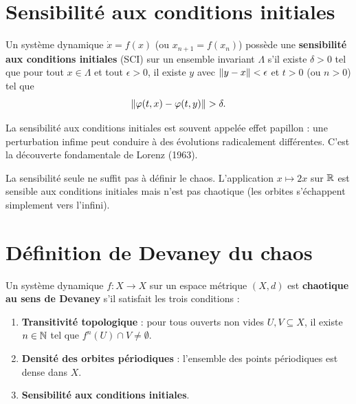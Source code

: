 \section{Sensibilit\'e aux conditions initiales}

\begin{definition}
Un syst\`eme dynamique $\dot{x} = f(x)$ (ou $x_{n+1} = f(x_n)$) poss\`ede
une \textbf{sensibilit\'e aux conditions initiales} (SCI) sur un ensemble
invariant $\Lambda$ s'il existe $\delta > 0$ tel que pour tout $x \in \Lambda$
et tout $\epsilon > 0$, il existe $y$ avec $\left\| y - x \right\| < \epsilon$ et
$t > 0$ (ou $n > 0$) tel que
\[
    \left\| \varphi(t, x) - \varphi(t, y) \right\| > \delta.
\]
\end{definition}

\begin{intuition}
La sensibilit\'e aux conditions initiales est souvent appel\'ee
\og effet papillon \fg : une perturbation infime peut conduire \`a des
\'evolutions radicalement diff\'erentes. C'est la d\'ecouverte fondamentale
de Lorenz (1963).
\end{intuition}

\begin{remarque}
La sensibilit\'e seule ne suffit pas \`a d\'efinir le chaos. L'application
$x \mapsto 2x$ sur $\mathbb{R}$ est sensible aux conditions initiales mais n'est
pas chaotique (les orbites s'\'echappent simplement vers l'infini).
\end{remarque}

\section{D\'efinition de Devaney du chaos}

\begin{definition}
\label{def:devaney}
Un syst\`eme dynamique $f : X \to X$ sur un espace m\'etrique $(X, d)$ est
\textbf{chaotique au sens de Devaney} s'il satisfait les trois conditions :
\begin{enumerate}
    \item \textbf{Transitivit\'e topologique} : pour tous ouverts non vides
    $U, V \subseteq X$, il existe $n \in \mathbb{N}$ tel que $f^n(U) \cap V \neq \emptyset$.
    \item \textbf{Densit\'e des orbites p\'eriodiques} : l'ensemble des points
    p\'eriodiques est dense dans $X$.
    \item \textbf{Sensibilit\'e aux conditions initiales}.
\end{enumerate}
\end{definition}

